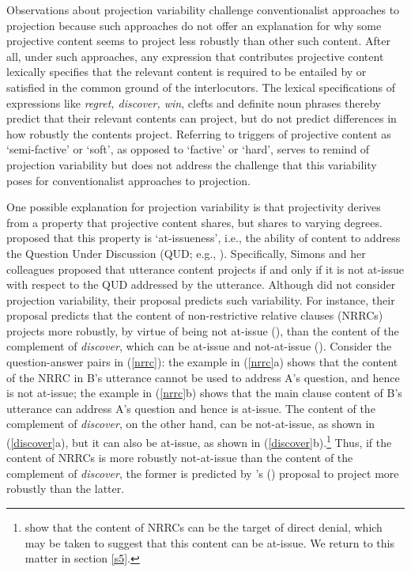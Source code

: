 \documentclass[11pt,fleqn]{article}
\newcommand{\6}{\mbox{$[\hspace*{-.6mm}[$}}
\newcommand{\9}{\mbox{$]\hspace*{-.6mm}]$}}
\newcommand{\citetpos}[1]{\citeauthor{#1}'s (\citeyear{#1})}
\begin{document}
Observations about projection variability challenge conventionalist approaches to projection because such approaches do not offer an explanation for why some projective content seems to project less robustly than other such content. After all, under such approaches, any expression that contributes projective content lexically specifies that the relevant content is required to be entailed by or satisfied in the common ground of the interlocutors. The lexical specifications of expressions like {\em regret, discover, win}, clefts and definite noun phrases thereby predict that their relevant contents can project, but do not predict differences in how robustly the contents project. Referring to triggers of projective content as `semi-factive' or `soft', as opposed to `factive' or `hard', serves to remind of projection variability but does not address the challenge that this variability poses for conventionalist approaches to projection.

One possible explanation for projection variability is that projectivity derives from a property that projective content shares, but shares to varying degrees. \citet{brst-salt10} proposed that this property is `at-issueness', i.e., the ability of content to address the Question Under Discussion (QUD; e.g., \citealt{roberts12}). Specifically, Simons and her colleagues proposed that utterance content projects if and only if it is not at-issue with respect to the QUD addressed by the utterance. Although \citet{brst-salt10} did not consider projection variability, their proposal predicts such variability. For instance, their proposal predicts that the content of non-restrictive relative clauses (NRRCs) projects more robustly, by virtue of being not at-issue (\citealt{potts05}), than the content of the complement of {\em discover}, which can be at-issue and not-at-issue (\citealt{simons07}). Consider the question-answer pairs in (\ref{nrrc}): the example in (\ref{nrrc}a) shows that the content of the NRRC in B's utterance cannot be used to address A's question, and hence is not at-issue; the example in (\ref{nrrc}b) shows that the main clause content of B's utterance can address A's question and hence is at-issue. The content of the complement of {\em discover}, on the other hand, can be not-at-issue, as shown in (\ref{discover}a), but it can also be at-issue, as shown in (\ref{discover}b).\footnote{\citet{syrett-koev2015} show that the content of NRRCs can be the target of direct denial, which may be taken to suggest that this content can be at-issue. We return to this matter in section \ref{s5}.} Thus, if the content of NRRCs is more robustly not-at-issue than the content of the complement of {\em discover}, the former is predicted by \citetpos{brst-salt10} proposal to project more robustly than the latter. 
\end{document}
